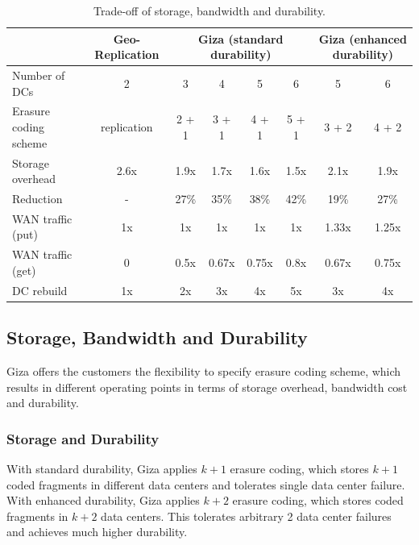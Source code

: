 \begin{table}[tp]
\centering
\begin{tabular}{|l||c||c|c|c|c||c|c|}
\hline
				& Geo-Replication    	& \multicolumn{4}{c||}{Giza (standard durability)}		& \multicolumn{2}{c|}{Giza (enhanced durability)}
\\ \hline \hline
Number of DCs 				& 2										& 3 & 4 & 5 & 6									& 5 & 6
\\ \hline
Erasure coding scheme & replication					& 2 + 1 & 3 + 1 & 4 + 1 & 5 + 1	& 3 + 2 & 4 + 2
\\ \hline \hline
Storage overhead			& 2.6x								& 1.9x & 1.7x & 1.6x & 1.5x			& 2.1x & 1.9x
\\ \hline
Reduction							& -										& 27\% & 35\% & 38\% & 42\%			& 19\% & 27\%
\\ \hline \hline
WAN traffic (put)			& 1x									& 1x & 1x & 1x & 1x 						& 1.33x & 1.25x
\\ \hline
WAN traffic (get)			& 0										& 0.5x & 0.67x & 0.75x & 0.8x		& 0.67x & 0.75x
\\ \hline
DC rebuild 						& 1x									& 2x & 3x & 4x & 5x 						& 3x & 4x
\\ \hline \hline
\end{tabular}
\caption{Trade-off of storage, bandwidth and durability.}
\label{tab:cost_benefit}
\end{table}


\subsection{Storage, Bandwidth and Durability}

Giza offers the customers the flexibility to specify erasure coding scheme, which results in different operating points in terms of storage overhead, bandwidth cost and durability.

\subsubsection{Storage and Durability}

With standard durability, Giza applies $k+1$ erasure coding, which stores $k+1$ coded fragments in different data centers and tolerates single data center failure. With enhanced durability, Giza applies $k+2$ erasure coding, which stores coded fragments in $k+2$ data centers. This tolerates arbitrary 2 data center failures and achieves much higher durability. 


